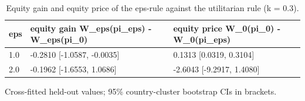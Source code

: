 \begin{table}[htbp]
\centering
\caption{Equity gain and equity price of the eps-rule against the utilitarian rule (k = 0.3).}
\label{tab:equity}
\begin{tabular}{lll}
\toprule
eps & equity gain W\_eps(pi\_eps) - W\_eps(pi\_0) & equity price W\_0(pi\_0) - W\_0(pi\_eps) \\
\midrule
1.0 & -0.2810 [-1.0587, -0.0035] & 0.1313 [0.0319, 0.3104] \\
2.0 & -0.1962 [-1.6553, 1.0686] & -2.6043 [-9.2917, 1.4080] \\
\bottomrule
\end{tabular}
\par\smallskip\footnotesize Cross-fitted held-out values; 95\% country-cluster bootstrap CIs in brackets.
\end{table}

